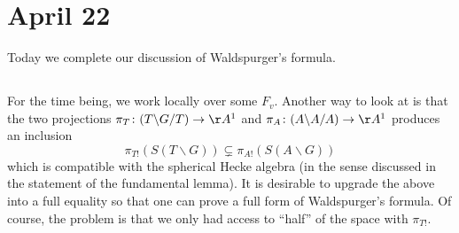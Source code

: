 \documentclass[../notes.tex]{subfiles}
\begin{document}
\section{April 22}
Today we complete our discussion of Waldspurger's formula.

\subsection{}
For the time being, we work locally over some $F_v$. Another way to look at  is that the two projections $\pi_T\colon(T\backslash G/T)\to\AA^1$ and $\pi_A\colon(A\backslash A/A)\to\AA^1$ produces an inclusion
\[\pi_{T!}(S(T\backslash G))\subsetneq\pi_{A!}(S(A\backslash G))\]
which is compatible with the spherical Hecke algebra (in the sense discussed in the statement of the fundamental lemma). It is desirable to upgrade the above into a full equality so that one can prove a full form of Waldspurger's formula. Of course, the problem is that we only had access to ``half'' of the space with $\pi_{T!}$.
\end{document}
